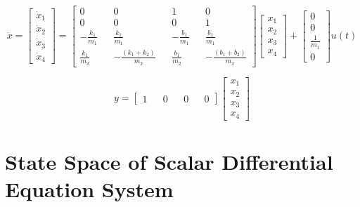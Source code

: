 \[
\dot{x} = 
\begin{bmatrix}
	\dot{x}_1 \\
	\dot{x}_2 \\
	\dot{x}_3 \\
	\dot{x}_4 
\end{bmatrix} =
\begin{bmatrix}
	0                 &   & 0                       &   & 1                 &   & 0                       \\
	0                 &   & 0                       &   & 0                 &   & 1                       \\
	- \frac{k_1}{m_1} &   & \frac{k_1}{m_1}         &   & - \frac{b_1}{m_1} &   & \frac{b_1}{m_1}         \\
	\frac{k_1}{m_2}   &   & - \frac{(k_1+k_2)}{m_2} &   & \frac{b_1}{m_2}   &   & - \frac{(b_1+b_2)}{m_2} 
\end{bmatrix}
\begin{bmatrix}
	x_1 \\
	x_2 \\
	x_3 \\
	x_4 
\end{bmatrix} +
\begin{bmatrix}
	0             \\
	0             \\
	\frac{1}{m_1} \\
	0             
\end{bmatrix} u(t)
\]

\[
y =
\begin{bmatrix}
	1 &   & 0 &   & 0 &   & 0 
\end{bmatrix}
\begin{bmatrix}
	x_1 \\
	x_2 \\
	x_3 \\
	x_4 
\end{bmatrix}
\]




\section{State Space of Scalar Differential Equation System}

